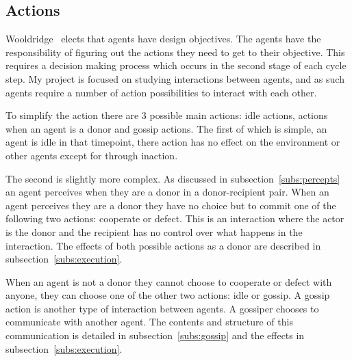 \documentclass[]{final_report}
\begin{document}
\subsection{Actions}
\label{subs:actions}
Wooldridge~\cite{wooldridge2009introduction} elects that agents have design objectives. The agents have the responsibility of figuring out the actions they need to get to their objective. This requires a decision making process which occurs in the second stage of each cycle step. My project is focused on studying interactions between agents, and as such agents require a number of action possibilities to interact with each other.\par
To simplify the action there are 3 possible main actions: idle actions, actions when an agent is a donor and gossip actions. The first of which is simple, an agent is idle in that timepoint, there action has no effect on the environment or other agents except for through inaction.\par
The second is slightly more complex. As discussed in subsection~\ref{subs:percepts} an agent perceives when they are a donor in a donor-recipient pair. When an agent perceives they are a donor they have no choice but to commit one of the following two actions: cooperate or defect. This is an interaction where the actor is the donor and the recipient has no control over what happens in the interaction. The effects of both possible actions as a donor are described in subsection~\ref{subs:execution}.\par
When an agent is not a donor they cannot choose to cooperate or defect with anyone, they can choose one of the other two actions: idle or gossip. A gossip action is another type of interaction between agents. A gossiper chooses to communicate with another agent. The contents and structure of this communication is detailed in subsection~\ref{subs:gossip} and the effects in subsection~\ref{subs:execution}.
\end{document}
